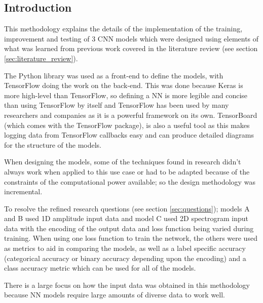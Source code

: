 \documentclass[12pt]{article}
\begin{document}
	\subsection{Introduction}
	This methodology explains the details of the implementation of the training, improvement and testing of 3 CNN models which were designed using elements of what was learned from previous work covered in the literature review (see section \ref{sec:literature_review}).\medskip
	
	The \textcite{Keras} Python library was used as a front-end to define the models, with TensorFlow doing the work on the back-end. This was done because Keras is more high-level than TensorFlow, so defining a NN is more legible and concise than using TensorFlow by itself and TensorFlow has been used by many researchers and companies as it is a powerful framework on its own. TensorBoard (which comes with the TensorFlow package), is also a useful tool as this makes logging data from TensorFlow callbacks easy and can produce detailed diagrams for the structure of the models.\medskip
	
	When designing the models, some of the techniques found in research didn't always work when applied to this use case or had to be adapted because of the constraints of the computational power available; so the design methodology was incremental.\medskip 
	
	To resolve the refined research questions (see section \ref{sec:questions}); models A and B used 1D amplitude input data and model C used 2D spectrogram input data with the encoding of the output data and loss function being varied during training. When using one loss function to train the network, the others were used as metrics to aid in comparing the models, as well as a label specific accuracy (categorical accuracy or binary accuracy depending upon the encoding) and a class accuracy metric which can be used for all of the models.\medskip
	
	There is a large focus on how the input data was obtained in this methodology because NN models require large amounts of diverse data to work well.\medskip
	
\end{document}
